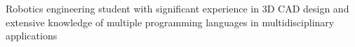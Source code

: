 Robotics engineering student with significant experience in 3D CAD design and extensive knowledge of
multiple programming languages in multidisciplinary applications

